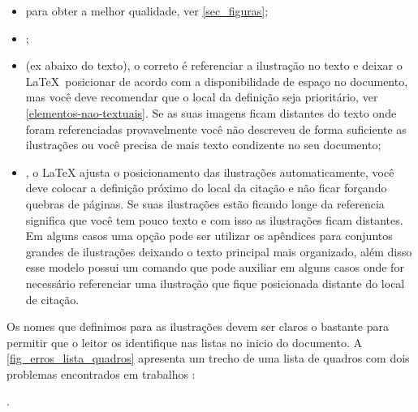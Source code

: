 \begin{itemize}
    \item {} para obter a melhor qualidade, ver \autoref{sec_figuras};

    \item {};

    \item {} (ex abaixo do texto), o correto é referenciar a ilustração no texto e deixar o \LaTeX\ posicionar de acordo com a disponibilidade de espaço no documento, mas você deve recomendar que o local da definição seja prioritário, ver \autoref{elementos-nao-textuais}. Se as suas imagens ficam distantes do texto onde foram referenciadas provavelmente você não descreveu de forma suficiente as ilustrações ou você precisa de mais texto condizente no seu documento;
    
    \item {}, o {\LaTeX} ajusta o posicionamento das ilustrações automaticamente, você deve colocar a definição próximo do local da citação e não ficar forçando quebras de páginas. Se suas ilustrações estão ficando longe da referencia significa que você tem pouco texto e com isso as ilustrações ficam distantes. Em alguns casos uma opção pode ser utilizar os apêndices para conjuntos grandes de ilustrações deixando o texto principal mais organizado, além disso esse modelo possui um comando  que pode auxiliar em alguns casos onde for necessário referenciar uma ilustração que fique posicionada distante do local de citação.
\end{itemize}

Os nomes que definimos para as ilustrações devem ser claros o bastante para permitir que o leitor os identifique nas listas no inicio do documento. A \autoref{fig_erros_lista_quadros} apresenta um trecho de uma lista de quadros com dois problemas encontrados em trabalhos :

\begin{itemize}

    .
    
\end{itemize}


